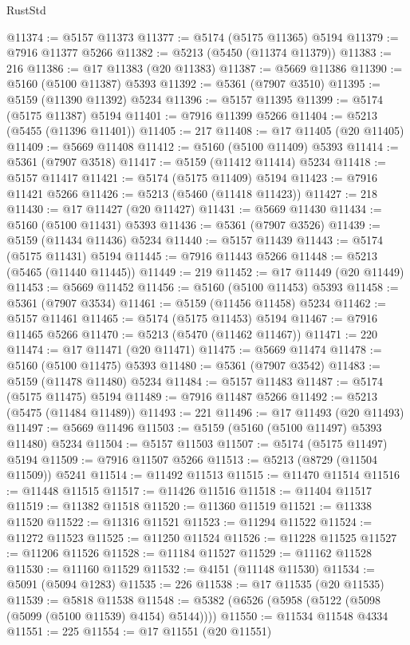 \begin{lexlean}{RustStd}
\begin{coremodule}
@11374 := @5157 @11373
@11377 := @5174 (@5175 @11365) @5194
@11379 := @7916 @11377 @5266
@11382 := @5213 (@5450 (@11374 @11379))
@11383 := 216
@11386 := @17 @11383 (@20 @11383)
@11387 := @5669 @11386
@11390 := @5160 (@5100 @11387) @5393
@11392 := @5361 (@7907 @3510)
@11395 := @5159 (@11390 @11392) @5234
@11396 := @5157 @11395
@11399 := @5174 (@5175 @11387) @5194
@11401 := @7916 @11399 @5266
@11404 := @5213 (@5455 (@11396 @11401))
@11405 := 217
@11408 := @17 @11405 (@20 @11405)
@11409 := @5669 @11408
@11412 := @5160 (@5100 @11409) @5393
@11414 := @5361 (@7907 @3518)
@11417 := @5159 (@11412 @11414) @5234
@11418 := @5157 @11417
@11421 := @5174 (@5175 @11409) @5194
@11423 := @7916 @11421 @5266
@11426 := @5213 (@5460 (@11418 @11423))
@11427 := 218
@11430 := @17 @11427 (@20 @11427)
@11431 := @5669 @11430
@11434 := @5160 (@5100 @11431) @5393
@11436 := @5361 (@7907 @3526)
@11439 := @5159 (@11434 @11436) @5234
@11440 := @5157 @11439
@11443 := @5174 (@5175 @11431) @5194
@11445 := @7916 @11443 @5266
@11448 := @5213 (@5465 (@11440 @11445))
@11449 := 219
@11452 := @17 @11449 (@20 @11449)
@11453 := @5669 @11452
@11456 := @5160 (@5100 @11453) @5393
@11458 := @5361 (@7907 @3534)
@11461 := @5159 (@11456 @11458) @5234
@11462 := @5157 @11461
@11465 := @5174 (@5175 @11453) @5194
@11467 := @7916 @11465 @5266
@11470 := @5213 (@5470 (@11462 @11467))
@11471 := 220
@11474 := @17 @11471 (@20 @11471)
@11475 := @5669 @11474
@11478 := @5160 (@5100 @11475) @5393
@11480 := @5361 (@7907 @3542)
@11483 := @5159 (@11478 @11480) @5234
@11484 := @5157 @11483
@11487 := @5174 (@5175 @11475) @5194
@11489 := @7916 @11487 @5266
@11492 := @5213 (@5475 (@11484 @11489))
@11493 := 221
@11496 := @17 @11493 (@20 @11493)
@11497 := @5669 @11496
@11503 := @5159 (@5160 (@5100 @11497) @5393 @11480) @5234
@11504 := @5157 @11503
@11507 := @5174 (@5175 @11497) @5194
@11509 := @7916 @11507 @5266
@11513 := @5213 (@8729 (@11504 @11509)) @5241
@11514 := @11492 @11513
@11515 := @11470 @11514
@11516 := @11448 @11515
@11517 := @11426 @11516
@11518 := @11404 @11517
@11519 := @11382 @11518
@11520 := @11360 @11519
@11521 := @11338 @11520
@11522 := @11316 @11521
@11523 := @11294 @11522
@11524 := @11272 @11523
@11525 := @11250 @11524
@11526 := @11228 @11525
@11527 := @11206 @11526
@11528 := @11184 @11527
@11529 := @11162 @11528
@11530 := @11160 @11529
@11532 := @4151 (@11148 @11530)
@11534 := @5091 (@5094 @1283)
@11535 := 226
@11538 := @17 @11535 (@20 @11535)
@11539 := @5818 @11538
@11548 := @5382 (@6526 (@5958 (@5122 (@5098 (@5099 (@5100 @11539) @4154) @5144))))
@11550 := @11534 @11548 @4334
@11551 := 225
@11554 := @17 @11551 (@20 @11551)

\end{coremodule}
\end{lexlean}
